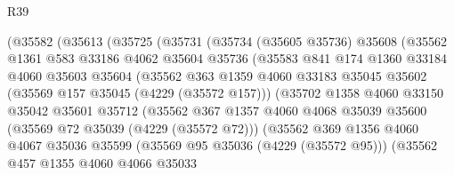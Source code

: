 \begin{lexlean}{R39}
\begin{coremodule}
                    (@35582
                      (@35613
                        (@35725
                          (@35731
                            (@35734
                              (@35605 @35736)
                              @35608
                              (@35562
                                @1361
                                @583
                                @33186
                                @4062
                                @35604
                                @35736
                                (@35583
                                  @841
                                  @174
                                  @1360
                                  @33184
                                  @4060
                                  @35603
                                  @35604
                                  (@35562
                                    @363
                                    @1359
                                    @4060
                                    @33183
                                    @35045
                                    @35602
                                    (@35569 @157 @35045 (@4229 (@35572 @157)))
                                    (@35702
                                      @1358
                                      @4060
                                      @33150
                                      @35042
                                      @35601
                                      @35712
                                      (@35562
                                        @367
                                        @1357
                                        @4060
                                        @4068
                                        @35039
                                        @35600
                                        (@35569 @72 @35039 (@4229 (@35572 @72)))
                                        (@35562
                                          @369
                                          @1356
                                          @4060
                                          @4067
                                          @35036
                                          @35599
                                          (@35569 @95 @35036 (@4229 (@35572 @95)))
                                          (@35562
                                            @457
                                            @1355
                                            @4060
                                            @4066
                                            @35033

\end{coremodule}
\end{lexlean}
